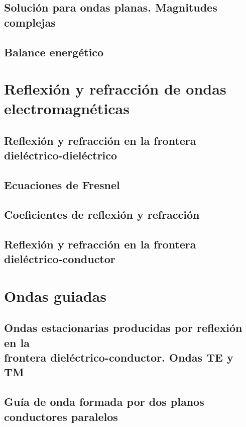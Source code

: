 \documentclass[a4paper]{book}
\begin{document}
\section{Solución para ondas planas. Magnitudes complejas}
\section{Balance energético}

\chapter{Reflexión y refracción de ondas electromagnéticas}
\section[Reflexión y refracción en la frontera dieléctrico-dieléctrico]{Reflexión y refracción en la frontera\\ dieléctrico-dieléctrico}
\section{Ecuaciones de Fresnel}
\section{Coeficientes de reflexión y refracción}
\section[Reflexión y refracción en la frontera dieléctrico-conductor]{Reflexión y refracción en la frontera\\ dieléctrico-conductor}

\chapter{Ondas guiadas}
\section{\texorpdfstring{Ondas estacionarias producidas por reflexión en la\\ frontera dieléctrico-conductor. Ondas TE y TM}{Ondas estacionarias producidas por reflexión en la frontera dieléctrico-conductor. Ondas TE y TM}}
\section{Guía de onda formada por dos planos conductores paralelos}
\end{document}
